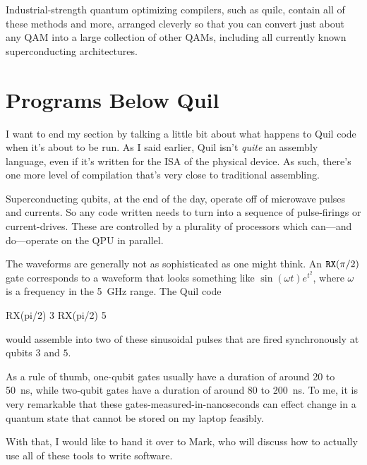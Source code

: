 Industrial-strength quantum optimizing compilers, such as quilc, contain all of these methods and more, arranged cleverly so that you can convert just about any QAM into a large collection of other QAMs, including all currently known superconducting architectures.

\section{Programs Below Quil}

I want to end my section by talking a little bit about what happens to Quil code when it's about to be run. As I said earlier, Quil isn't \emph{quite} an assembly language, even if it's written for the ISA of the physical device. As such, there's one more level of compilation that's very close to traditional assembling.

Superconducting qubits, at the end of the day, operate off of microwave pulses and currents. So any code written needs to turn into a sequence of pulse-firings or current-drives. These are controlled by a plurality of processors which can---and do---operate on the QPU in parallel.

The waveforms are generally not as sophisticated as one might think. An $\mathtt{RX}(\pi/2)$ gate corresponds to a waveform that looks something like $\sin(\omega t)e^{t^2}$, where $\omega$ is a frequency in the 5~GHz range. The Quil code
\begin{quil}
RX(pi/2) 3
RX(pi/2) 5
\end{quil}
would assemble into two of these sinusoidal pulses that are fired synchronously at qubits $3$ and $5$.

As a rule of thumb, one-qubit gates usually have a duration of around 20 to 50~ns, while two-qubit gates have a duration of around 80 to 200~ns. To me, it is very remarkable that these gates-measured-in-nanoseconds can effect change in a quantum state that cannot be stored on my laptop feasibly.

With that, I would like to hand it over to Mark, who will discuss how to actually use all of these tools to write software.